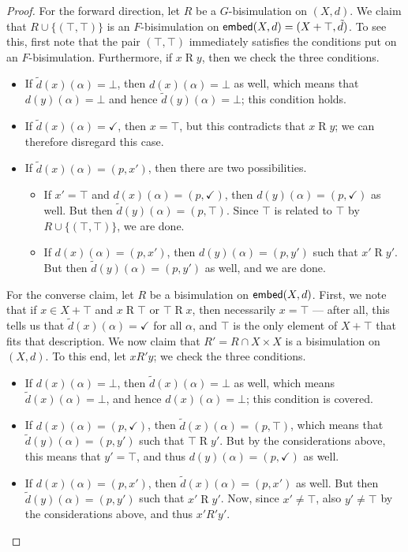 \documentclass[orivec,envcountsect,envcountsame]{llncs}
\begin{document}
\restateembedbisimilar*
\begin{proof}
	For the forward direction, let $R$ be a $G$-bisimulation on $(X, d)$.
	We claim that $R \cup \{ (\top, \top) \}$ is an $F$-bisimulation on $\mathsf{embed}(X,d) = (X+\top, \tilde{d})$.
	To see this, first note that the pair $(\top, \top)$ immediately satisfies the conditions put on an $F$-bisimulation.
	Furthermore, if $x \mathrel{R} y$, then we check the three conditions.
	\begin{itemize}
		\item
		If $\tilde{d}(x)(\alpha) = \bot$, then $d(x)(\alpha) = \bot$ as well, which means that $d(y)(\alpha) = \bot$ and hence $\tilde{d}(y)(\alpha) = \bot$; this condition holds.
		\item
		If $\tilde{d}(x)(\alpha) = \checkmark$, then $x = \top$, but this contradicts that $x \mathrel{R} y$; we can therefore disregard this case.
		\item
		If $\tilde{d}(x)(\alpha) = (p, x')$, then there are two possibilities.
		\begin{itemize}
			\item
			If $x' = \top$ and $d(x)(\alpha) = (p, \checkmark)$, then $d(y)(\alpha) = (p, \checkmark)$ as well.
			But then $\tilde{d}(y)(\alpha) = (p, \top)$.
			Since $\top$ is related to $\top$ by $R \cup \{ (\top, \top) \}$, we are done.

			\item
			If $d(x)(\alpha) = (p, x')$, then $d(y)(\alpha) = (p, y')$ such that $x' \mathrel{R} y'$.
			But then $\tilde{d}(y)(\alpha) = (p, y')$ as well, and we are done.
		\end{itemize}
	\end{itemize}
	For the converse claim, let $R$ be a bisimulation on $\mathsf{embed}(X, d)$.
	First, we note that if $x \in X + \top$ and $x \mathrel{R} \top$ or $\top \mathrel{R} x$, then necessarily $x = \top$ --- after all, this tells us that $\tilde{d}(x)(\alpha) = \checkmark$ for all $\alpha$, and $\top$ is the only element of $X + \top$ that fits that description.
	We now claim that $R' = R \cap X \times X$ is a bisimulation on $(X, d)$.
	To this end, let $x \mathrel{R'} y$; we check the three conditions.
	\begin{itemize}
		\item
		If $d(x)(\alpha) = \bot$, then $\tilde{d}(x)(\alpha) = \bot$ as well, which means $\tilde{d}(x)(\alpha) = \bot$, and hence $d(x)(\alpha) = \bot$; this condition is covered.
		\item
		If $d(x)(\alpha) = (p, \checkmark)$, then $\tilde{d}(x)(\alpha) = (p, \top)$, which means that $\tilde{d}(y)(\alpha) = (p, y')$ such that $\top \mathrel{R} y'$.
		But by the considerations above, this means that $y' = \top$, and thus $d(y)(\alpha) = (p, \checkmark)$ as well.
		\item
		If $d(x)(\alpha) = (p, x')$, then $\tilde{d}(x)(\alpha) = (p, x')$ as well.
		But then $\tilde{d}(y)(\alpha) = (p, y')$ such that $x' \mathrel{R} y'$.
		Now, since $x' \neq \top$, also $y' \neq \top$ by the considerations above, and thus $x' \mathrel{R'} y'$.
	\end{itemize}
\end{proof}
\end{document}
